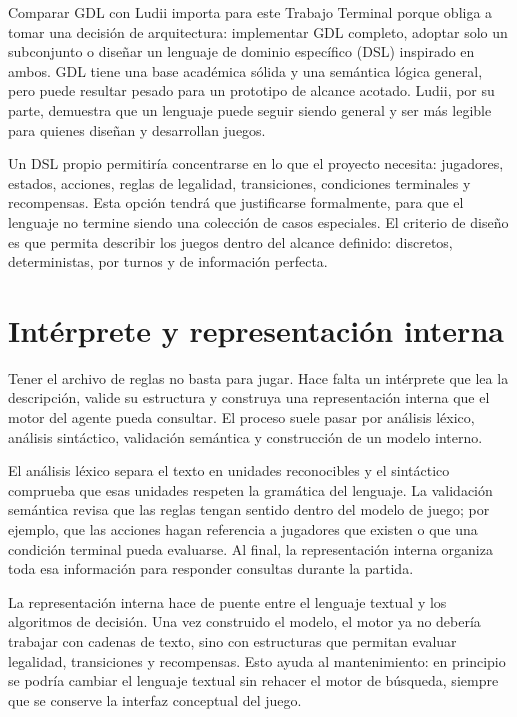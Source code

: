 Comparar GDL con Ludii importa para este Trabajo Terminal porque obliga a tomar una decisión de arquitectura: implementar GDL completo, adoptar solo un subconjunto o diseñar un lenguaje de dominio específico (DSL) inspirado en ambos. GDL tiene una base académica sólida y una semántica lógica general, pero puede resultar pesado para un prototipo de alcance acotado. Ludii, por su parte, demuestra que un lenguaje puede seguir siendo general y ser más legible para quienes diseñan y desarrollan juegos.

Un DSL propio permitiría concentrarse en lo que el proyecto necesita: jugadores, estados, acciones, reglas de legalidad, transiciones, condiciones terminales y recompensas. Esta opción tendrá que justificarse formalmente, para que el lenguaje no termine siendo una colección de casos especiales. El criterio de diseño es que permita describir los juegos dentro del alcance definido: discretos, deterministas, por turnos y de información perfecta.

\section{Intérprete y representación interna}

Tener el archivo de reglas no basta para jugar. Hace falta un intérprete que lea la descripción, valide su estructura y construya una representación interna que el motor del agente pueda consultar. El proceso suele pasar por análisis léxico, análisis sintáctico, validación semántica y construcción de un modelo interno.

El análisis léxico separa el texto en unidades reconocibles y el sintáctico comprueba que esas unidades respeten la gramática del lenguaje. La validación semántica revisa que las reglas tengan sentido dentro del modelo de juego; por ejemplo, que las acciones hagan referencia a jugadores que existen o que una condición terminal pueda evaluarse. Al final, la representación interna organiza toda esa información para responder consultas durante la partida.

La representación interna hace de puente entre el lenguaje textual y los algoritmos de decisión. Una vez construido el modelo, el motor ya no debería trabajar con cadenas de texto, sino con estructuras que permitan evaluar legalidad, transiciones y recompensas. Esto ayuda al mantenimiento: en principio se podría cambiar el lenguaje textual sin rehacer el motor de búsqueda, siempre que se conserve la interfaz conceptual del juego.

